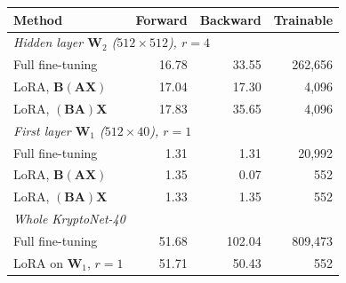 \begin{tabular}{lrrr}
\toprule
Method & Forward & Backward & Trainable \\
\midrule
\multicolumn{4}{l}{\emph{Hidden layer $\mathbf{W}_2$ ($512\times512$), $r=4$}} \\
Full fine-tuning & 16.78 & 33.55 & 262,656 \\
LoRA, $\mathbf{B}(\mathbf{A}\mathbf{X})$ & 17.04 & 17.30 & 4,096 \\
LoRA, $(\mathbf{B}\mathbf{A})\mathbf{X}$ & 17.83 & 35.65 & 4,096 \\
\midrule
\multicolumn{4}{l}{\emph{First layer $\mathbf{W}_1$ ($512\times40$), $r=1$}} \\
Full fine-tuning & 1.31 & 1.31 & 20,992 \\
LoRA, $\mathbf{B}(\mathbf{A}\mathbf{X})$ & 1.35 & 0.07 & 552 \\
LoRA, $(\mathbf{B}\mathbf{A})\mathbf{X}$ & 1.33 & 1.35 & 552 \\
\midrule
\multicolumn{4}{l}{\emph{Whole KryptoNet-40}} \\
Full fine-tuning & 51.68 & 102.04 & 809,473 \\
LoRA on $\mathbf{W}_1$, $r=1$ & 51.71 & 50.43 & 552 \\
\bottomrule
\end{tabular}
